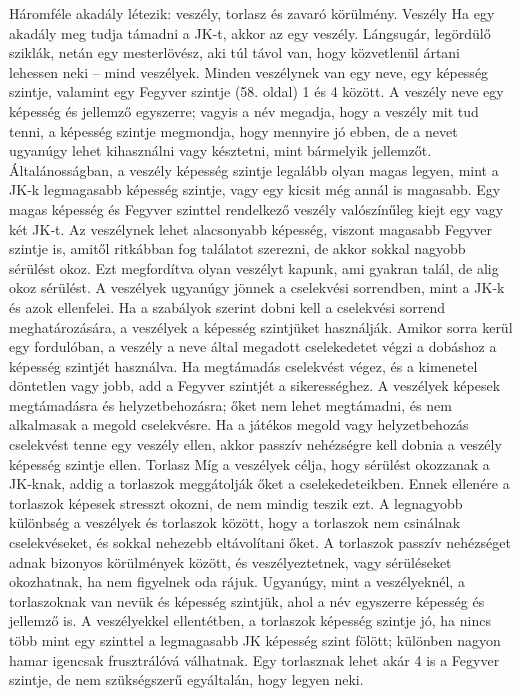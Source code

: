 \documentclass[oneside]{book}
\begin{document}
Háromféle akadály létezik: veszély, torlasz és zavaró körülmény.
Veszély
Ha egy akadály meg tudja támadni a JK‑t, akkor az egy veszély. Lángsugár, legördülő sziklák, netán egy mesterlövész, aki túl távol van, hogy közvetlenül ártani lehessen neki – mind veszélyek. Minden veszélynek van egy neve, egy képesség szintje, valamint egy Fegyver szintje (58. oldal) 1 és 4 között.
A veszély neve egy képesség és jellemző egyszerre; vagyis a név megadja, hogy a veszély mit tud tenni, a képesség szintje megmondja, hogy mennyire jó ebben, de a nevet ugyanúgy lehet kihasználni vagy késztetni, mint bármelyik jellemzőt.
Általánosságban, a veszély képesség szintje legalább olyan magas legyen, mint a JK‑k legmagasabb képesség szintje, vagy egy kicsit még annál is magasabb. Egy magas képesség és Fegyver szinttel rendelkező veszély valószínűleg kiejt egy vagy két JK‑t. Az veszélynek lehet alacsonyabb képesség, viszont magasabb Fegyver szintje is, amitől ritkábban fog találatot szerezni, de akkor sokkal nagyobb sérülést okoz. Ezt megfordítva olyan veszélyt kapunk, ami gyakran talál, de alig okoz sérülést.
A veszélyek ugyanúgy jönnek a cselekvési sorrendben, mint a JK‑k és azok ellenfelei. Ha a szabályok szerint dobni kell a cselekvési sorrend meghatározására, a veszélyek a képesség szintjüket használják. Amikor sorra kerül egy fordulóban, a veszély a neve által megadott cselekedetet végzi a dobáshoz a képesség szintjét használva. Ha megtámadás cselekvést végez, és a kimenetel döntetlen vagy jobb, add a Fegyver szintjét a sikerességhez. A veszélyek képesek megtámadásra és helyzetbehozásra; őket nem lehet megtámadni, és nem alkalmasak a megold cselekvésre.
Ha a játékos megold vagy helyzetbehozás cselekvést tenne egy veszély ellen, akkor passzív nehézségre kell dobnia a veszély képesség szintje ellen.
Torlasz
Míg a veszélyek célja, hogy sérülést okozzanak a JK‑knak, addig a torlaszok meggátolják őket a cselekedeteikben. Ennek ellenére a torlaszok képesek stresszt okozni, de nem mindig teszik ezt. A legnagyobb különbség a veszélyek és torlaszok között, hogy a torlaszok nem csinálnak cselekvéseket, és sokkal nehezebb eltávolítani őket. A torlaszok passzív nehézséget adnak bizonyos körülmények között, és veszélyeztetnek, vagy sérüléseket okozhatnak, ha nem figyelnek oda rájuk.
Ugyanúgy, mint a veszélyeknél, a torlaszoknak van nevük és képesség szintjük, ahol a név egyszerre képesség és jellemző is. A veszélyekkel ellentétben, a torlaszok képesség szintje jó, ha nincs több mint egy szinttel a legmagasabb JK képesség szint fölött; különben nagyon hamar igencsak frusztrálóvá válhatnak. Egy torlasznak lehet akár 4 is a Fegyver szintje, de nem szükségszerű egyáltalán, hogy legyen neki.
\end{document}
